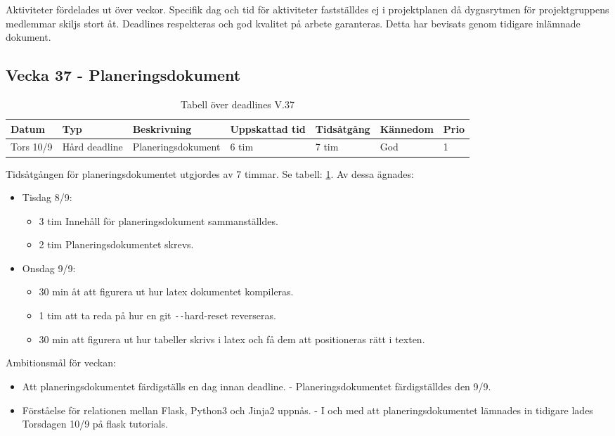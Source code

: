 \documentclass{TDP003mall}
\begin{document}
 Aktiviteter fördelades ut över veckor. Specifik dag och tid för aktiviteter fastställdes ej i projektplanen då dygnsrytmen för projektgruppens medlemmar skiljs stort åt. Deadlines respekteras och god kvalitet på arbete garanteras. Detta har bevisats genom tidigare inlämnade dokument.

 \subsection*{Vecka 37 - Planeringsdokument}

 \begin{table}[h!]
   \caption{Tabell över deadlines V.37\label{tab:2}}
   \begin{tabularx}{\linewidth}{|l|l|X|l|l|l|l|}
  \hline
  Datum     & Typ           & Beskrivning        & Uppskattad tid & Tidsåtgång & Kännedom & Prio \\ [0.5ex]
  \hline                                             
  Tors 10/9 & Hård deadline & Planeringsdokument & 6 tim          & 7 tim      & God      & 1    \\
  \hline
   \end{tabularx}   
\end{table}

Tidsåtgången för planeringsdokumentet utgjordes av 7 timmar. Se tabell: \ref{tab:2}. Av dessa ägnades:
\begin{itemize}
  \item Tisdag 8/9:
  \begin{itemize}
    \item 3 tim Innehåll för planeringsdokument sammanställdes.
    \item 2 tim Planeringsdokumentet skrevs.
  \end{itemize}
  \item Onsdag 9/9:
  \begin{itemize}
    \item 30 min åt att figurera ut hur latex dokumentet kompileras.
    \item 1 tim att ta reda på hur en git \texttt{-{}-}hard-reset reverseras.
    \item 30 min att figurera ut hur tabeller skrivs i latex och få dem att positioneras rätt i texten.\\
  \end{itemize}
      \end{itemize}

      Ambitionsmål för veckan:
      \begin{itemize}
      \item Att planeringsdokumentet färdigställs en dag innan deadline. - Planeringsdokumentet färdigställdes den 9/9.
      \item Förståelse för relationen mellan Flask, Python3 och Jinja2 uppnås. - I och med att planeringsdokumentet lämnades in tidigare lades Torsdagen 10/9 på flask tutorials.
      \end{itemize}
      
\end{document}
